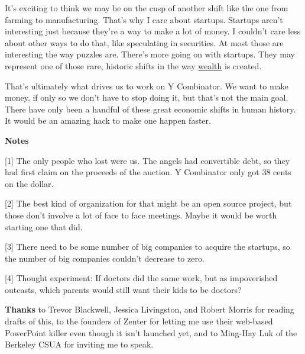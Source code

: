 It's exciting to think we may be on the cusp of another shift like the
one from farming to manufacturing. That's why I care about startups.
Startups aren't interesting just because they're a way to make a lot of
money. I couldn't care less about other ways to do that, like
speculating in securities. At most those are interesting the way puzzles
are. There's more going on with startups. They may represent one of
those rare, historic shifts in the way \href{wealth.html}{wealth} is
created.

That's ultimately what drives us to work on Y Combinator. We want to
make money, if only so we don't have to stop doing it, but that's not
the main goal. There have only been a handful of these great economic
shifts in human history. It would be an amazing hack to make one happen
faster.

\textbf{Notes}

{[}1{]} The only people who lost were us. The angels had convertible
debt, so they had first claim on the proceeds of the auction. Y
Combinator only got 38 cents on the dollar.

{[}2{]} The best kind of organization for that might be an open source
project, but those don't involve a lot of face to face meetings. Maybe
it would be worth starting one that did.

{[}3{]} There need to be some number of big companies to acquire the
startups, so the number of big companies couldn't decrease to zero.

{[}4{]} Thought experiment: If doctors did the same work, but as
impoverished outcasts, which parents would still want their kids to be
doctors?

\textbf{Thanks} to Trevor Blackwell, Jessica Livingston, and Robert
Morris for reading drafts of this, to the founders of Zenter for letting
me use their web-based PowerPoint killer even though it isn't launched
yet, and to Ming-Hay Luk of the Berkeley CSUA for inviting me to speak.
